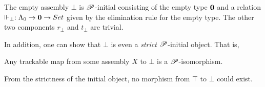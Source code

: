 \documentclass[draft,a4paper,UKenglish,numberwithinsect,cleveref,thm-restate]{lipics-v2021}
\numberwithin{equation}{section}
\theoremstyle{definition}
\theoremstyle{plain}
\begin{document}
\begin{example}
The empty assembly $\bot$ is $\mathscr{P}$-initial consisting of the empty type $\mathbf{0}$ and a relation $\Vdash_\bot : \Lambda_0 \to \Empty \to \set$ given by the elimination rule for the empty type.
The other two components $r_\bot$ and $t_\bot$ are trivial.
\end{example}

In addition, one can show that $\bot$ is even a \emph{strict} $\mathscr{P}$-initial object. That is, 
\begin{proposition}\label{prop:strict-initial}
  Any trackable map from some assembly $X$ to $\bot$ is a $\mathscr{P}$-isomorphism. 
\end{proposition}
From the strictness of the initial object, no morphism from $\top$ to $\bot$ could exist.
\end{document}
